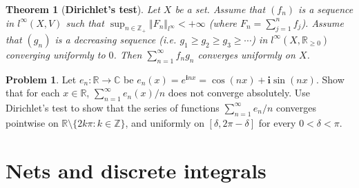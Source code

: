\documentclass[12pt,b5paper,notitlepage]{article}
\theoremstyle{definition}
\newtheorem{prob}{\color{red}Problem}[section]
\newtheorem{sprob}[prob]{\color{red}$\star$ Problem}
\theoremstyle{plain}
\newtheorem{thm}[df]{Theorem}
\newcommand{\ovl}{\overline}
\newcommand{\im}{\mathbf{i}}
\newcommand{\Cbb}{\mathbb C}
\newcommand{\Zbb}{\mathbb Z}
\newcommand{\Rbb}{\mathbb R}
\numberwithin{equation}{section}
\begin{document}
\begin{thm}[\textbf{Dirichlet's test}]\label{lb481}
Let $X$ be a set. Assume that $(f_n)$ is a sequence in $l^\infty(X,V)$ such that $\sup_{n\in\Zbb_+}\Vert F_n\Vert_{l^\infty}<+\infty$ (where $F_n=\sum_{j=1}^n f_j$). Assume that $(g_n)$ is a decreasing sequence (i.e. $g_1\geq g_2\geq g_3\geq\cdots$) in $l^\infty(X,\Rbb_{\geq0})$ converging uniformly to $0$. Then $\sum_{n=1}^\infty f_ng_n$ converges uniformly on $X$.
\end{thm}


\begin{prob}\label{lb394}
Let $e_n:\Rbb\rightarrow\Cbb$ be $e_n(x)=e^{\im nx}=\cos(nx)+\im\sin(nx)$. Show that for each $x\in\Rbb$, $\sum_{n=1}^\infty e_n(x)/n$ does not converge absolutely. Use Dirichlet's test to show that the series of functions $\sum_{n=1}^\infty e_n/n$ converges pointwise on $\Rbb\setminus\{2k\pi:k\in\Zbb\}$, and uniformly on $[\delta,2\pi-\delta]$ for every $0<\delta<\pi$.
\end{prob}











\begin{comment}

\subsection{Problems and supplementary material}

\begin{sprob}
Consider a power series $\sum a_nz^n$ where $a_n\in\Rbb_{\geq 0}$ for each $n$. Let $R$ be its radius of convergence. Prove that the following are equivalent.
\begin{enumerate}[label=(\arabic*)]
\item $\sum a_n<+\infty$.
\item $\sum a_nz^n$ converges uniformly on $\ovl B_\Cbb(0,R)$ to a continuous function.
\item $\sum a_nz^n$ converges uniformly on $B_\Cbb(0,R)$.
\end{enumerate}
\end{sprob}
\end{comment}


\newpage


\section{Nets and discrete integrals}
\end{document}
